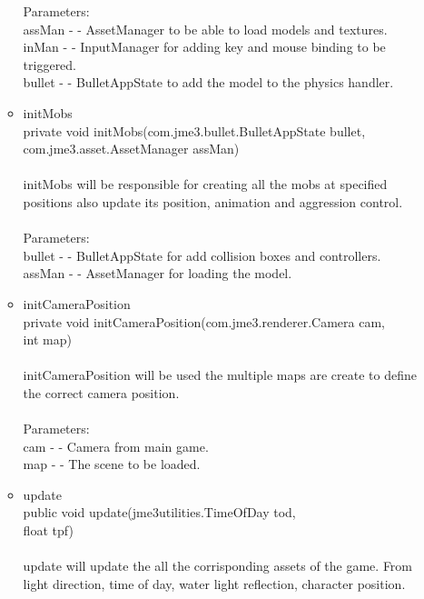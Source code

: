 \documentclass[letterpaper]{article}
\begin{document}
\begin{itemize}
\begin{itemize}
											Parameters: \\
											assMan - - AssetManager to be able to load models and textures. \\
											inMan - - InputManager for adding key and mouse binding to be triggered. \\
											bullet - - BulletAppState to add the model to the physics handler.
									\item	initMobs \\
											private void initMobs(com.jme3.bullet.BulletAppState bullet, \\
		            com.jme3.asset.AssetManager assMan) \\ \\
											initMobs will be responsible for creating all the mobs at specified positions also update its position, animation and aggression control. \\ \\
											Parameters: \\
											bullet - - BulletAppState for add collision boxes and controllers. \\
											assMan - - AssetManager for loading the model. \\
									\item	initCameraPosition \\
											private void initCameraPosition(com.jme3.renderer.Camera cam, \\
		                      int map) \\ \\
											initCameraPosition will be used the multiple maps are create to define the correct camera position. \\ \\
											Parameters: \\
											cam - - Camera from main game. \\
											map - - The scene to be loaded. \\
									\item	update \\
											public void update(jme3utilities.TimeOfDay tod, \\
		          float tpf) \\ \\
											update will update the all the corrisponding assets of the game. From light direction, time of day, water light reflection, character position. \\ \\

\end{itemize}
\end{itemize}
\end{document}
